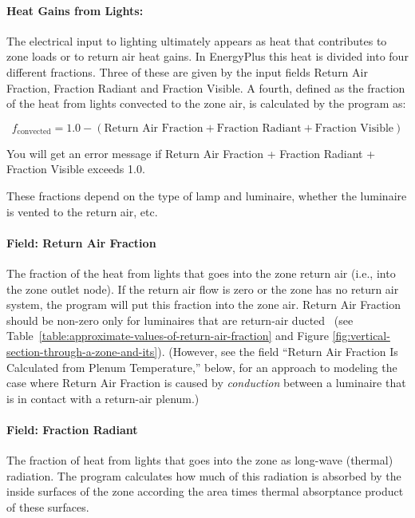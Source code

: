 \paragraph{Heat Gains from Lights:}\label{heat-gains-from-lights}

The electrical input to lighting ultimately appears as heat that contributes to zone loads or to return air heat gains. In EnergyPlus this heat is divided into four different fractions. Three of these are given by the input fields Return Air Fraction, Fraction Radiant and Fraction Visible. A fourth, defined as the fraction of the heat from lights convected to the zone air, is calculated by the program as:

$$ f_{\textrm{convected}} = 1.0 - (\textrm{Return Air Fraction} + \textrm{Fraction Radiant} + \textrm{Fraction Visible}) $$

You will get an error message if Return Air Fraction + Fraction Radiant + Fraction Visible exceeds 1.0.

These fractions depend on the type of lamp and luminaire, whether the luminaire is vented to the return air, etc.

\paragraph{Field: Return Air Fraction}\label{field-return-air-fraction}

The fraction of the heat from lights that goes into the zone return air (i.e., into the zone outlet node). If the return air flow is zero or the zone has no return air system, the program will put this fraction into the zone air. Return Air Fraction should be non-zero only for luminaires that are return-air ducted~ (see Table~\ref{table:approximate-values-of-return-air-fraction} and Figure \ref{fig:vertical-section-through-a-zone-and-its}). (However, see the field ``Return Air Fraction Is Calculated from Plenum Temperature,'' below, for an approach to modeling the case where Return Air Fraction is caused by \emph{conduction} between a luminaire that is in contact with a return-air plenum.)

\paragraph{Field: Fraction Radiant}\label{field-fraction-radiant-1}

The fraction of heat from lights that goes into the zone as long-wave (thermal) radiation. The program calculates how much of this radiation is absorbed by the inside surfaces of the zone according the area times thermal absorptance product of these surfaces.

